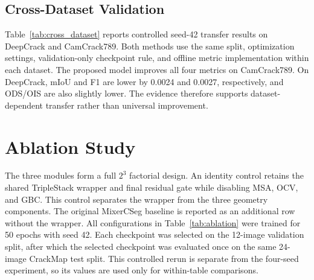 \documentclass[preprint,12pt]{elsarticle}
\begin{document}
\subsection{Cross-Dataset Validation}

Table~\ref{tab:cross_dataset} reports controlled seed-42 transfer results on DeepCrack and CamCrack789. Both methods use the same split, optimization settings, validation-only checkpoint rule, and offline metric implementation within each dataset. The proposed model improves all four metrics on CamCrack789. On DeepCrack, mIoU and F1 are lower by 0.0024 and 0.0027, respectively, and ODS/OIS are also slightly lower. The evidence therefore supports dataset-dependent transfer rather than universal improvement.

\begin{table}[H]
\centering
\caption{Controlled cross-dataset evaluation. CrackMap values are four-seed means; DeepCrack and CamCrack789 use seed 42. Bold marks the better controlled result within each dataset.}
\label{tab:cross_dataset}
\end{table}

\section{Ablation Study}
\label{sec:ablation}

The three modules form a full $2^3$ factorial design. An identity control retains the shared TripleStack wrapper and final residual gate while disabling MSA, OCV, and GBC. This control separates the wrapper from the three geometry components. The original MixerCSeg baseline is reported as an additional row without the wrapper. All configurations in Table~\ref{tab:ablation} were trained for 50 epochs with seed 42. Each checkpoint was selected on the 12-image validation split, after which the selected checkpoint was evaluated once on the same 24-image CrackMap test split. This controlled rerun is separate from the four-seed experiment, so its values are used only for within-table comparisons.
\end{document}
